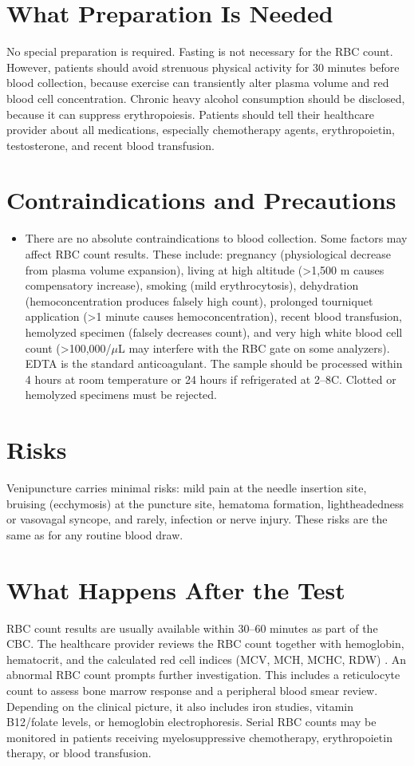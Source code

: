\section*{What Preparation Is Needed}
No special preparation is required. Fasting is not necessary for the RBC count. However, patients should avoid strenuous physical activity for 30 minutes before blood collection, because exercise can transiently alter plasma volume and red blood cell concentration. Chronic heavy alcohol consumption should be disclosed, because it can suppress erythropoiesis. Patients should tell their healthcare provider about all medications, especially chemotherapy agents, erythropoietin, testosterone, and recent blood transfusion.

\section*{Contraindications and Precautions}
\begin{itemize}
  \item There are no absolute contraindications to blood collection. Some factors may affect RBC count results. These include: pregnancy (physiological decrease from plasma volume expansion), living at high altitude (>1,500 m causes compensatory increase), smoking (mild erythrocytosis), dehydration (hemoconcentration produces falsely high count), prolonged tourniquet application (>1 minute causes hemoconcentration), recent blood transfusion, hemolyzed specimen (falsely decreases count), and very high white blood cell count (>100,000/$\mu$L may interfere with the RBC gate on some analyzers). EDTA is the standard anticoagulant. The sample should be processed within 4 hours at room temperature or 24 hours if refrigerated at 2--8\textdegree{}C. Clotted or hemolyzed specimens must be rejected.
\end{itemize}
\section*{Risks}
Venipuncture carries minimal risks: mild pain at the needle insertion site, bruising (ecchymosis) at the puncture site, hematoma formation, lightheadedness or vasovagal syncope, and rarely, infection or nerve injury. These risks are the same as for any routine blood draw.

\section*{What Happens After the Test}
RBC count results are usually available within 30--60 minutes as part of the CBC. The healthcare provider reviews the RBC count together with hemoglobin, hematocrit, and the calculated red cell indices (MCV, MCH, MCHC, RDW) \cite{wallach2022interpretation}. An abnormal RBC count prompts further investigation. This includes a reticulocyte count to assess bone marrow response and a peripheral blood smear review. Depending on the clinical picture, it also includes iron studies, vitamin B12/folate levels, or hemoglobin electrophoresis. Serial RBC counts may be monitored in patients receiving myelosuppressive chemotherapy, erythropoietin therapy, or blood transfusion.

